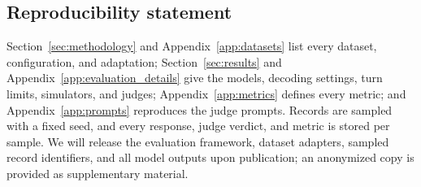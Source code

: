 \subsection*{Reproducibility statement}

Section~\ref{sec:methodology} and Appendix~\ref{app:datasets} list every dataset, configuration, and adaptation; Section~\ref{sec:results} and Appendix~\ref{app:evaluation_details} give the models, decoding settings, turn limits, simulators, and judges; Appendix~\ref{app:metrics} defines every metric; and Appendix~\ref{app:prompts} reproduces the judge prompts. Records are sampled with a fixed seed, and every response, judge verdict, and metric is stored per sample. We will release the evaluation framework, dataset adapters, sampled record identifiers, and all model outputs upon publication; an anonymized copy is provided as supplementary material.

